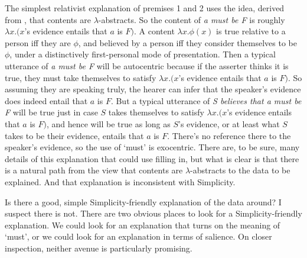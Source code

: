 The simplest relativist explanation of premises 1 and 2 uses the idea, derived from \citet{Lewis1979b}, that contents are $\lambda$-abstracts. So the content of \textit{a must be F} is roughly $\lambda x.(x$'s evidence entails that $a$ is $F).$ A content $\lambda x. \phi(x)$ is true relative to a person iff they are $\phi$, and believed by a person iff they consider themselves to be $\phi$, under a distinctively first-personal mode of presentation. Then a typical utterance of \textit{a must be F} will be autocentric because if the asserter thinks it is true, they must take themselves to satisfy $\lambda x.(x$'s evidence entails that $a$ is $F).$ So assuming they are speaking truly, the hearer can infer that the speaker's evidence does indeed entail that $a$ is $F$. But a typical utterance of \textit{S believes that a must be F} will be true just in case $S$ takes themselves to satisfy $\lambda x.(x$'s evidence entails that $a$ is $F)$, and hence will be true as long as $S$'s evidence, or at least what $S$ takes to be their evidence, entails that $a$ is $F$. There's no reference there to the speaker's evidence, so the use of `must' is exocentric. There are, to be sure, many details of this explanation that could use filling in, but what is clear is that there is a natural path from the view that contents are $\lambda$-abstracts to the data to be explained. And that explanation is inconsistent with Simplicity.

Is there a good, simple Simplicity-friendly explanation of the data around? I suspect there is not. There are two obvious places to look for a Simplicity-friendly explanation. We could look for an explanation that turns on the meaning of `must', or we could look for an explanation in terms of salience. On closer inspection, neither avenue is particularly promising.

